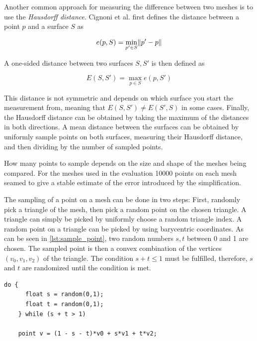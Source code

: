 Another common approach for measuring the difference between two meshes is to use the \emph{Hausdorff distance}. Cignoni et al. \cite{cignoni1998metro} first defines the distance between a point $p$ and a surface $S$ as

\[e(p, S) = \min_{p' \in S} \norm*{p' - p}\]

A one-sided distance between two surfaces \(S, S'\) is then defined as

\[E(S, S') = \max_{p \in S} e(p, S')\]

This distance is not symmetric and depends on which surface you start the measurement from, meaning that \(E(S, S') \neq E(S', S)\) in some cases. Finally, the Hausdorff distance can be obtained by taking the maximum of the distances in both directions. A mean distance between the surfaces can be obtained by uniformly sample points on both surfaces, measuring their Hausdorff distance, and then dividing by the number of sampled points.

How many points to sample depends on the size and shape of the meshes being compared. For the meshes used in the evaluation 10000 points on each mesh seamed to give a stable estimate of the error introduced by the simplification.

The sampling of a point on a mesh can be done in two steps: First, randomly pick a triangle of the mesh, then pick a random point on the chosen triangle. A triangle can simply be picked by uniformly choose a random triangle index. A random point on a triangle can be picked by using barycentric coordinates. As can be seen in \cref{lst:sample_point}, two random numbers \(s, t\) between 0 and 1 are chosen. The sampled point is then a convex combination of the vertices \((v_0, v_1, v_2)\) of the triangle. The condition \(s + t \leq 1\) must be fulfilled, therefore, $s$ and $t$ are randomized until the condition is met.  

\begin{minipage}{\textwidth}
  \begin{lstlisting}[caption={Sampling point on triangle by using barycentric coordinates}, label={lst:sample_point}]
    do {
      float s = random(0,1);
      float t = random(0,1);
    } while (s + t > 1)

    point v = (1 - s - t)*v0 + s*v1 + t*v2;
  \end{lstlisting}
\end{minipage}

